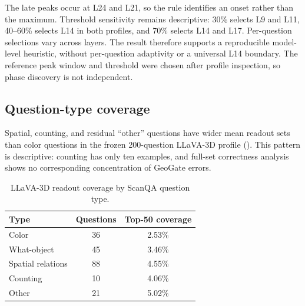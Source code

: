 The late peaks occur at L24 and L21, so the rule identifies an onset rather than the maximum. Threshold sensitivity remains descriptive: 30\% selects L9 and L11, 40--60\% selects L14 in both profiles, and 70\% selects L14 and L17. Per-question selections vary across layers. The result therefore supports a reproducible model-level heuristic, without per-question adaptivity or a universal L14 boundary. The reference peak window and threshold were chosen after profile inspection, so phase discovery is not independent.

\subsection{Question-type coverage}
Spatial, counting, and residual ``other'' questions have wider mean readout sets than color questions in the frozen 200-question LLaVA-3D profile (). This pattern is descriptive: counting has only ten examples, and full-set correctness analysis shows no corresponding concentration of GeoGate errors.

\begin{table}[t]
\centering
\caption{LLaVA-3D readout coverage by ScanQA question type.}
\label{tab:supp_qtype}
\begin{tabular}{lcc}
\toprule
Type & Questions & Top-50 coverage \\
\midrule
Color & 36 & 2.53\% \\
What-object & 45 & 3.46\% \\
Spatial relations & 88 & 4.55\% \\
Counting & 10 & 4.06\% \\
Other & 21 & 5.02\% \\
\bottomrule
\end{tabular}
\end{table}
